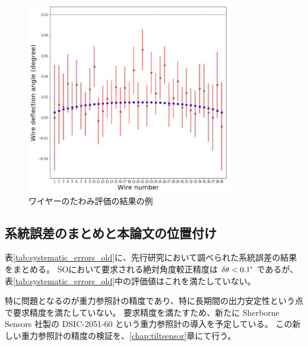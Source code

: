 \documentclass[../../main.tex]{subfiles}
\begin{document}
\begin{figure}[H]
    \centering
    \includegraphics[width=0.8\textwidth]{wiregrid/wiresag_result_old.pdf}
    \caption{ワイヤーのたわみ評価の結果の例\cite{swg:murata}}
    \label{fig:wiresag_result_old}    
\end{figure}

\subsection{系統誤差のまとめと本論文の位置付け}
表\ref{tab:systematic_errors_old}に、先行研究において調べられた系統誤差の結果をまとめる。
SOにおいて要求される絶対角度較正精度は $\delta\theta < 0.1\tcdegree$ であるが、
表\ref{tab:systematic_errors_old}中の評価値はこれを満たしていない。

特に問題となるのが重力参照計の精度であり、特に長期間の出力安定性という点で要求精度を満たしていない。
要求精度を満たすため、新たに Sherborne Sensors 社製の DSIC-2051-60 という重力参照計の導入を予定している。
この新しい重力参照計の精度の検証を、\ref{chap:tiltsensor}章にて行う。
\end{document}
